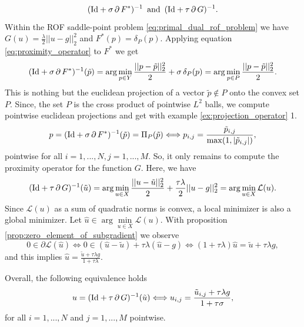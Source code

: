 \documentclass{scrreprt}
\begin{document}
                $$
                    (\textnormal{Id} + \sigma\,\partial\,F^{\ast})^{-1} \,\,\, \textnormal{and} \,\,\, (\textnormal{Id} + \tau\,\partial\,G)^{-1}.
                $$
            Within the ROF saddle-point problem \ref{eq:primal_dual_rof_problem} we have $G(u) = \frac{\lambda}{2} ||u - g||_{2}^{2}$ and $F^{\ast}(p) = \delta_{P}(p)$. Applying equation \ref{eq:proximity_operator} to $F^{\ast}$ we get
                $$
                    (\textnormal{Id} + \sigma\,\partial\,F^{\ast})^{-1}(\tilde{p}) = \arg \min_{p \in Y} \frac{||p - \tilde{p}||_{2}^{2}}{2} + \sigma\,\delta_{P}(p) = \arg \min_{p \in P} \frac{||p - \tilde{p}||_{2}^{2}}{2}.
                $$
            This is nothing but the euclidean projection of a vector $\tilde{p} \notin P$ onto the convex set $P$. Since, the set $P$ is the cross product of pointwise $L^{2}$ balls, we compute pointwise euclidean projections and get with example \ref{ex:projection_operator} 1.
                $$
                    p = (\textnormal{Id} + \sigma\,\partial\,F^{\ast})^{-1}(\tilde{p}) = \Pi_{P}(\tilde{p}) \Longleftrightarrow p_{i,j} = \frac{\tilde{p}_{i, j}}{\max(1, |\tilde{p}_{i, j}|)},
                $$
            pointwise for all $i = 1, ..., N, j = 1, ..., M$. So, it only remains to compute the proximity operator for the function $G$. Here, we have
                $$
                    (\textnormal{Id} + \tau\,\partial\,G)^{-1}(\tilde{u}) = \arg \min_{u \in X} \frac{||u - \tilde{u}||_{2}^{2}}{2} + \frac{\tau\lambda}{2} ||u - g||_{2}^{2} = \arg \min_{u \in X} \mathcal{L}(u).
                $$
            Since $\mathcal{L}(u)$ as a sum of quadratic norms is convex, a local minimizer is also a global minimizer. Let $\hat{u} \in \arg \min\limits_{u \in X} \mathcal{L}(u)$. With proposition \ref{prop:zero_element_of_subgradient} we observe
                $$
                    0 \in \partial \mathcal{L}(\hat{u}) \Longleftrightarrow 0 \in (\hat{u} - \tilde{u}) + \tau\lambda (\hat{u} - g) \Longleftrightarrow (1 + \tau\lambda)\hat{u} = \tilde{u} + \tau\lambda g,
                $$
            and this implies $\hat{u} = \frac{\tilde{u} + \tau\lambda g}{1 + \tau\lambda}$.


            Overall, the following equivalence holds
                \begin{equation}
                    u = (\textnormal{Id} + \tau\,\partial\,G)^{-1}(\tilde{u}) \Longleftrightarrow u_{i,j} = \frac{\tilde{u}_{i,j} + \tau\lambda g}{1 + \tau\sigma},
                \label{eq:proximity_operator_g_rof}
                \end{equation}
            for all $i = 1, ..., N$ and $j = 1, ..., M$ pointwise.
\end{document}
